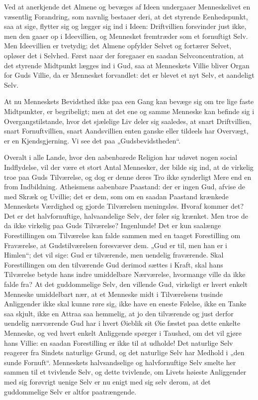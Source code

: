 \documentclass[12pt]{book}
\begin{document}
Ved at anerkjende det Almene og bevæges af Ideen undergaaer
Menneskelivet en væsentlig Forandring, som navnlig bestaaer deri, at
det styrende Eenhedspunkt, saa
at sige, flytter sig og lægger sig ind i Ideen: Driftvillien
forsvinder just ikke, men den gaaer op i Ideevillien, og Mennesket
fremtræder som et fornuftigt Selv. Men Ideevillien er tvetydig; det
Almene opfylder Selvet og fortærer Selvet, opløser det i Selvhed.
Først naar der foregaaer en saadan Selvconcentration, at det
styrende Midtpunkt lægges ind i Gud, saa at Menneskets Villie bliver
Organ for Guds Villie, da er Mennesket forvandlet: det er blevet et
nyt Selv, et aandeligt Selv.

At nu Menneskets Bevidsthed ikke paa een Gang kan bevæge sig om tre
lige faste Midtpunkter, er begribeligt; men at det ene og samme
Menneske kan befinde sig i Overgangstilstande, hvor det sjælelige
Liv deler sig saaledes, at snart Driftvillien, snart Fornuftvillien,
snart Aandsvillien enten ganske eller tildeels har Overvægt, er en
Kjendsgjerning. Vi see det paa „Gudsbevidstheden“.

Overalt i alle Lande, hvor den aabenbarede Religion har udøvet nogen
social Indflydelse, vil der være et stort Antal Mennesker, der bilde
sig ind, at de virkelig troe paa Guds Tilværelse, og dog er denne
deres Tro ikke synderligt Mere end en from Indbildning. Atheismens
aabenbare Paastand: der er ingen Gud, afvise de med Skræk og
Uvillie; det er dem, som om en saadan Paastand krænkede Menneskets
Værdighed og gjorde Tilværelsen meningsløs. Hvoraf kommer det? Det
er det halvfornuftige, halvaandelige Selv, der føler sig krænket.
Men troe de da ikke virkelig paa Guds Tilværelse? Ingenlunde! Det er
kun saalænge Forestillingen om Tilværelse kan falde sammen med en
taaget Forestilling om Fraværelse, at Gudstilværelsen foresvæver
dem. „Gud er til, men han er i Himlen“; det vil sige: Gud er
tilværende, men uendelig fraværende. Skal Forestillingen om den
tilværende Gud derimod sættes i Kraft, skal hans Tilværelse betyde
hans indre umiddelbare Nærværelse,
hvormange ville da ikke falde fra? At det guddommelige Selv, den
villende Gud, virkeligt er hvert enkelt Menneske umiddelbart nær, at
et Menneske midt i Tilværelsens tusinde Anliggender ikke skal kunne
røre sig, ikke have en eneste Følelse, ikke en Tanke saa skjult,
ikke en Attraa saa hemmelig, at jo den tilværende og just derfor
uendelig nærværende Gud har i hvert Øieblik sit Øie fæstet paa dette
enkelte Menneske, og ved hvert enkelt Anliggende spørger i Taushed,
om det vil gjøre hans Villie: en saadan Forestilling er ikke til at
udholde! Det naturlige Selv reagerer fra Sindets naturlige Grund, og
det naturlige Selv har Medhold i „den sunde Fornuft“. Menneskets
halvsandselige og halvfornuftige Selv smelte her sammen til et
tvivlende Selv, og dette tvivlende, om Livets høieste Anliggender
med sig forøvrigt uenige Selv er nu enigt med sig selv derom, at det
guddommelige Selv er altfor paatrængende.
\end{document}
